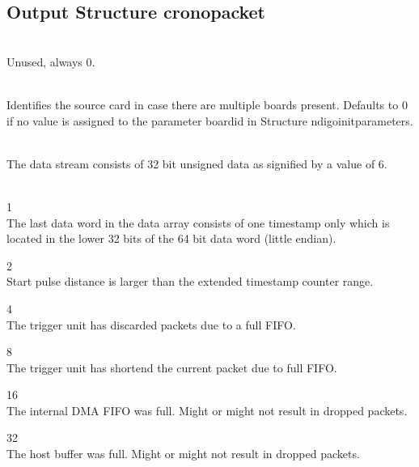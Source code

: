 \subsection{Output Structure crono\tu packet}

	\\
	Unused, always 0.\par

	\\
	Identifies the source card in case there are multiple boards present. Defaults to 0 if no value is assigned to the parameter \textsf{board\tu id} in Structure \textsf{ndigo\tu init\tu parameters}.\par

	\\
	The data stream consists of 32 bit unsigned data as signified by a value of 6.\par

	\\
	\indent{} 1\\
	\indent The last data word in the data array consists of one timestamp only which is located in the lower 32 bits of the 64 bit data word (little endian).\par
	\indent{} 2\\
	\indent Start pulse distance is larger than the extended timestamp counter range.\par
	\indent{} 4\\
	\indent The trigger unit has discarded packets due to a full FIFO.\par
	\indent{} 8\\
	\indent The trigger unit has shortend the current packet due to full FIFO.\par
	\indent{} 16\\
	\indent The internal DMA FIFO was full. Might or might not result in dropped packets.\par
	\indent{} 32\\
	\indent The host buffer was full. Might or might not result in dropped packets.\par

